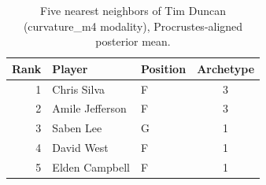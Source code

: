 \begin{table}[htbp]
  \centering\small
  \begin{tabular}{rllc}
    \toprule
    Rank & Player & Position & Archetype \\
    \midrule
    1 & Chris Silva & F & 3 \\
    2 & Amile Jefferson & F & 3 \\
    3 & Saben Lee & G & 1 \\
    4 & David West & F & 1 \\
    5 & Elden Campbell & F & 1 \\
    \bottomrule
  \end{tabular}
  \caption{Five nearest neighbors of Tim Duncan (curvature_m4 modality), Procrustes-aligned posterior mean.}
  \label{tab:Tim_Duncan_neighbors_curvature_m4}
\end{table}

